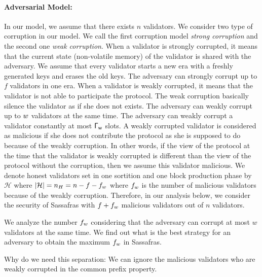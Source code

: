 \paragraph{Adversarial Model:} In our model, we assume that there exists $ n $ validators.  We consider two type of corruption in our model. We call the first corruption model \emph{strong corruption} and the second one \emph{weak corruption}. When a validator is strongly corrupted, it means that the current state (non-volatile memory) of the validator is shared with the adversary. We assume that every validator starts a new era with a freshly generated keys and erases the old keys. The adversary can strongly corrupt up to $ f $ validators in one era.  
When a validator is weakly corrupted, it means that the validator is not able to participate the protocol. The weak corruption basically silence the validator as if she does not exists. The adversary can weakly corrupt up to $ w $ validators at the same time. The adversary can weakly corrupt a validator constantly at most  $ \mathsf{\Gamma_{w}} $ slots. A weakly corrupted validator is considered as malicious if she does not contribute the protocol as she is supposed to do because of the weakly corruption.  In other words, if the view of the protocol at the time that the validator is weakly corrupted is different than the view of the protocol without the corruption, then we assume this validator malicious.  We denote honest validators set in one sortition and one block production phase by $ \mathcal{H} $ where $ |\mathcal{H}| = n_H = n-f - f_{w}$ where $ f_{w} $ is the number of malicious validators because of the weakly corruption.  Therefore, in our analysis below, we consider the security of Sassafras with $ f + f_{w}$ malicious validators out of $ n $ validators. 

We analyze the number $ f_{w} $ considering that the adversary can corrupt at most $ w $ validators at the same time. We find out what is the best strategy for an adversary to obtain the maximum $ f_{w} $ in Sassafras.


Why do we need this separation: We can ignore the malicious validators who are weakly corrupted in the common prefix property.




